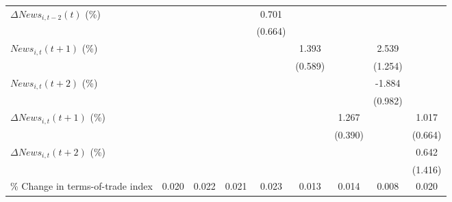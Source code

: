 {\begin{tabular}{l*{8}{c}}
\addlinespace
$ \Delta News_{i,t-2}(t)$ (\%)&                     &                     &                     &       0.701         &                     &                     &                     &                     \\
                    &                     &                     &                     &     (0.664)         &                     &                     &                     &                     \\
\addlinespace
$ News_{i,t}(t+1)$ (\%)&                     &                     &                     &                     &       1.393\sym{**} &                     &       2.539\sym{**} &                     \\
                    &                     &                     &                     &                     &     (0.589)         &                     &     (1.254)         &                     \\
\addlinespace
$ News_{i,t}(t+2)$ (\%)&                     &                     &                     &                     &                     &                     &      -1.884\sym{*}  &                     \\
                    &                     &                     &                     &                     &                     &                     &     (0.982)         &                     \\
\addlinespace
$ \Delta News_{i,t}(t+1)$ (\%)&                     &                     &                     &                     &                     &       1.267\sym{***}&                     &       1.017         \\
                    &                     &                     &                     &                     &                     &     (0.390)         &                     &     (0.664)         \\
\addlinespace
$ \Delta News_{i,t}(t+2)$ (\%)&                     &                     &                     &                     &                     &                     &                     &       0.642         \\
                    &                     &                     &                     &                     &                     &                     &                     &     (1.416)         \\
\addlinespace
\% Change in terms-of-trade index&       0.020         &       0.022         &       0.021         &       0.023         &       0.013         &       0.014         &       0.008         &       0.020         \\

\end{tabular}}
